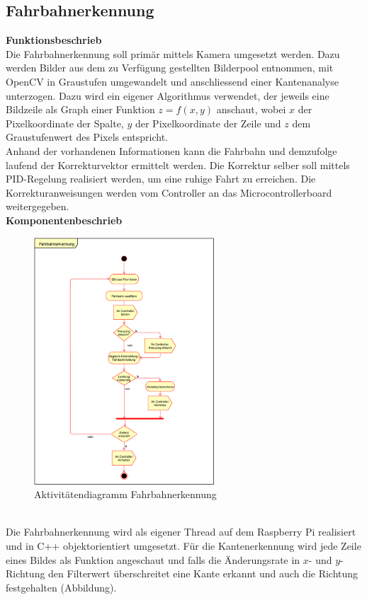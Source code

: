 \subsection{Fahrbahnerkennung}
\textbf{Funktionsbeschrieb}\\[0.2cm]
Die Fahrbahnerkennung soll primär mittels Kamera umgesetzt werden. Dazu werden Bilder aus dem zu Verfügung gestellten Bilderpool entnommen, mit OpenCV in Graustufen umgewandelt und anschliessend einer Kantenanalyse unterzogen. Dazu wird ein eigener Algorithmus verwendet, der jeweils eine Bildzeile als Graph einer Funktion $z = f(x,y)$ anschaut, wobei $x$ der Pixelkoordinate der Spalte, $y$ der Pixelkoordinate der Zeile und $z$ dem Graustufenwert des Pixels entspricht.\\
Anhand der vorhandenen Informationen kann die Fahrbahn und demzufolge laufend der Korrekturvektor ermittelt werden. Die Korrektur selber soll mittels PID-Regelung realisiert werden, um eine ruhige Fahrt zu erreichen. Die Korrekturanweisungen werden vom Controller an das Microcontrollerboard weitergegeben.\\[0.2cm]
\textbf{Komponentenbeschrieb}
\begin{figure}[h]%
\centering
\includegraphics[width=0.6\textwidth]{03_Loesungskonzept/pictures/Fahrbahnerkennung.png}
\caption{Aktivitätendiagramm Fahrbahnerkennung}
\label{fig:activityRoute}
\end{figure}\\[0.2cm]
Die Fahrbahnerkennung wird als eigener Thread auf dem Raspberry Pi realisiert und in C++ objektorientiert umgesetzt. Für die Kantenerkennung wird jede Zeile eines Bildes als Funktion angeschaut und falls die Änderungsrate in $x$- und $y$-Richtung den Filterwert überschreitet eine Kante erkannt und auch die Richtung festgehalten (Abbildung).\\
